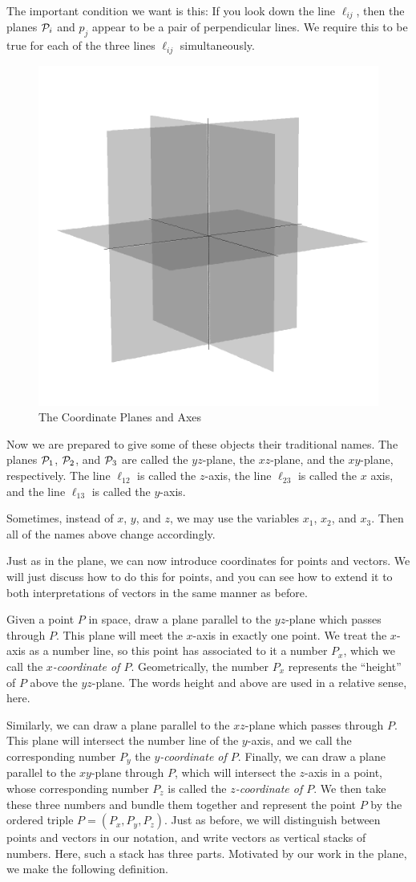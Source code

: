\documentclass[00-livre-main.tex]{subfiles}
\begin{document}
The important condition we want is this: If you look down the line $\ell_{ij}$, then the planes $\mathcal{P}_i$ and $p_j$ appear to be a pair of perpendicular lines. We require this to be true for each of the three lines $\ell_{ij}$ simultaneously.


\begin{figure}[h!]
\centering
\includegraphics[width=.4\textwidth]{images/coord-planes.png}
\caption{The Coordinate Planes and Axes}
\label{fig:3d-coords}
\end{figure}

Now we are prepared to give some of these objects their traditional names. The planes $\mathcal{P}_1$, $\mathcal{P}_2$, and $\mathcal{P}_3$ are called the $yz$-plane, the $xz$-plane, and the $xy$-plane, respectively. The line $\ell_{12}$ is called the $z$-axis, the line $\ell_{23}$ is called the $x$ axis, and the line $\ell_{13}$ is called the $y$-axis.

Sometimes, instead of $x$, $y$, and $z$, we may use the variables $x_1$, $x_2$, and $x_3$. Then all of the names above change accordingly.

Just as in the plane, we can now introduce coordinates for points and vectors. We will just discuss how to do this for points, and you can see how to extend it to both interpretations of vectors in the same manner as before.

Given a point $P$ in space, draw a plane parallel to the $yz$-plane which passes through $P$. This plane will meet the $x$-axis in exactly one point. 
We treat the $x$-axis as a number line, so this point has associated to it a number $P_x$, which we call the \emph{$x$-coordinate of $P$}. 
Geometrically, the number $P_x$ represents the ``height'' of $P$ above the $yz$-plane. 
The words height and above are used in a relative sense, here.

Similarly, we can draw a plane parallel to the $xz$-plane which passes through $P$. This plane will intersect the number line of the $y$-axis, and we call the corresponding number $P_y$ the \emph{$y$-coordinate of $P$}. 
Finally, we can draw a plane parallel to the $xy$-plane through $P$, which will intersect the $z$-axis in a point, whose corresponding number $P_z$ is called the \emph{$z$-coordinate of $P$}. 
We then take these three numbers and bundle them together and represent the point $P$ by the ordered triple $P = (P_x, P_y, P_z)$.
Just as before, we will distinguish between points and vectors in our notation, and write vectors as vertical stacks of numbers. Here, such a stack has three parts. Motivated by our work in the plane, we make the following definition.
\end{document}

